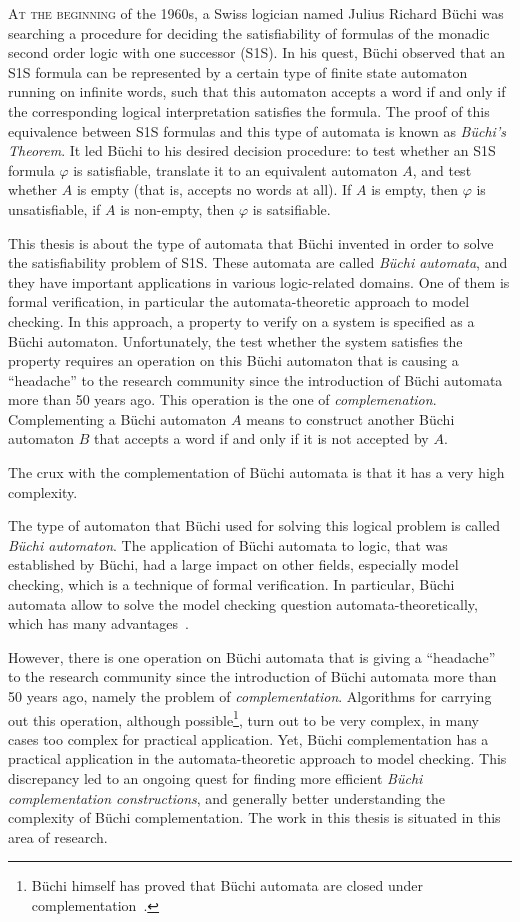 \lettrine{A}{t the beginning} of the 1960s, a Swiss logician named Julius Richard Büchi was searching a procedure for deciding the satisfiability of formulas of the monadic second order logic with one successor (S1S). In his quest, Büchi observed that an S1S formula can be represented by a certain type of finite state automaton running on infinite words, such that this automaton accepts a word if and only if the corresponding logical interpretation satisfies the formula. The proof of this equivalence between S1S formulas and this type of automata is known as \textit{Büchi's Theorem}. It led Büchi to his desired decision procedure: to test whether an S1S formula $\varphi$ is satisfiable, translate it to an equivalent automaton $A$, and test whether $A$ is empty (that is, accepts no words at all). If $A$ is empty, then $\varphi$ is unsatisfiable, if $A$ is non-empty, then $\varphi$ is satsifiable.~\cite{buchi1960decision}

This thesis is about the type of automata that Büchi invented in order to solve the satisfiability problem of S1S. These automata are called \textit{Büchi automata}, and they have important applications in various logic-related domains. One of them is formal verification, in particular the automata-theoretic approach to model checking. In this approach, a property to verify on a system is specified as a Büchi automaton. Unfortunately, the test whether the system satisfies the property requires an operation on this Büchi automaton that is causing a ``headache'' to the research community since the introduction of Büchi automata more than 50 years ago. This operation is the one of \textit{complemenation}. Complementing a Büchi automaton $A$ means to construct another Büchi automaton $B$ that accepts a word if and only if it is not accepted by $A$.

The crux with the complementation of Büchi automata is that it has a very high complexity. 


The type of automaton that Büchi used for solving this logical problem is called \textit{Büchi automaton}. The application of Büchi automata to logic, that was established by Büchi, had a large impact on other fields, especially model checking, which is a technique of formal verification. In particular, Büchi automata allow to solve the model checking question automata-theoretically, which has many advantages~\cite{1996_vardi}.

However, there is one operation on Büchi automata that is giving a ``headache'' to the research community since the introduction of Büchi automata more than 50 years ago, namely the problem of \textit{complementation}. Algorithms for carrying out this operation, although possible\footnote{Büchi himself has proved that Büchi automata are closed under complementation~\cite{buchi1960decision}.}, turn out to be very complex, in many cases too complex for practical application. Yet, Büchi complementation has a practical application in the automata-theoretic approach to model checking. This discrepancy led to an ongoing quest for finding more efficient \textit{Büchi complementation constructions}, and generally better understanding the complexity of Büchi complementation. The work in this thesis is situated in this area of research.

